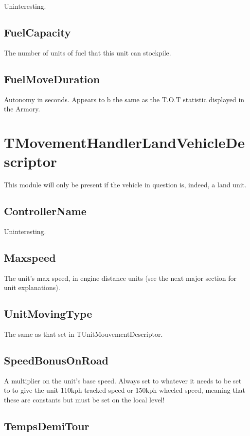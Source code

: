 \documentclass{article}
\begin{document}
Uninteresting.

\subsection{FuelCapacity}

The number of units of fuel that this unit can stockpile.

\subsection{FuelMoveDuration}

Autonomy in seconds. Appears to b the same as the T.O.T statistic displayed in the Armory.

\section{TMovementHandlerLandVehicleDescriptor}

This module will only be present if the vehicle in question is, indeed, a land unit.

\subsection{ControllerName}

Uninteresting.

\subsection{Maxspeed}

The unit's max speed, in engine distance units (see the next major section for unit explanations).

\subsection{UnitMovingType}

The same as that set in TUnitMouvementDescriptor.

\subsection{SpeedBonusOnRoad}

A multiplier on the unit's base speed. Always set to whatever it needs to be set to to give the unit 110kph tracked speed or 150kph wheeled speed, meaning that these are constants but must be set on the local level!

\subsection{TempsDemiTour}
\end{document}
